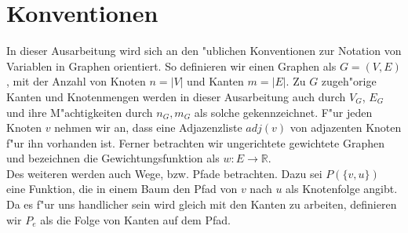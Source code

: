 \section{Konventionen}
In dieser Ausarbeitung wird sich an den "ublichen Konventionen zur Notation
    von Variablen in Graphen orientiert. So definieren wir einen Graphen als
    $G = (V,E)$, mit der Anzahl von Knoten $n = |V|$ und Kanten $m = |E|$.
    Zu $G$ zugeh"orige Kanten und Knotenmengen werden in dieser Ausarbeitung
    auch durch $V_G$, $E_G$ und ihre M"achtigkeiten durch $n_G, m_G$
    als solche gekennzeichnet.
    F"ur jeden Knoten $v$ nehmen wir an, dass eine Adjazenzliste $adj(v)$ von
    adjazenten Knoten f"ur ihn vorhanden ist.
    Ferner betrachten wir ungerichtete gewichtete Graphen und bezeichnen 
    die Gewichtungsfunktion als $w: E \rightarrow \mathbb{R}$.\\
Des weiteren werden auch Wege, bzw. Pfade betrachten. 
    Dazu sei $P(\{v,u\})$ eine Funktion, die in einem Baum den Pfad 
    von $v$ nach $u$ als Knotenfolge angibt.
    Da es f"ur uns handlicher sein wird
    gleich mit den Kanten zu arbeiten, definieren wir $P_e$ als die Folge von
    Kanten auf dem Pfad.\\
